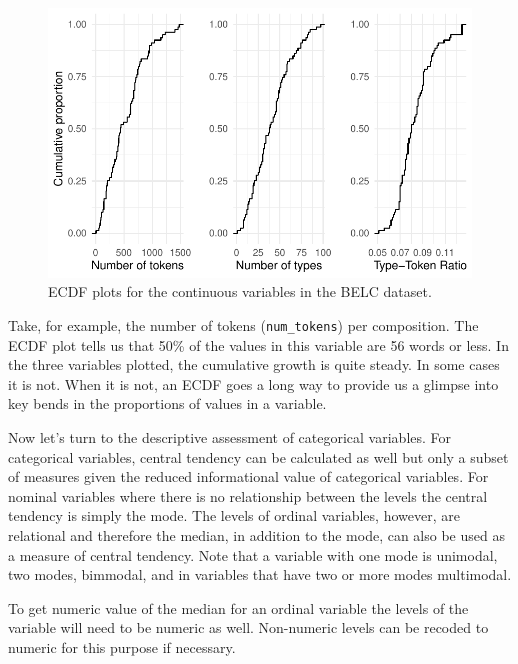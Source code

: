 \documentclass[
  letterpaper,
]{scrbook}
\begin{document}
\begin{figure}[h]

{\centering \includegraphics{./approaching-analysis_files/figure-pdf/fig-summarize-ecdf-belc-1.pdf}

}

\caption{\label{fig-summarize-ecdf-belc}ECDF plots for the continuous
variables in the BELC dataset.}

\end{figure}

Take, for example, the number of tokens (\texttt{num\_tokens}) per
composition. The ECDF plot tells us that 50\% of the values in this
variable are 56 words or less. In the three variables plotted, the
cumulative growth is quite steady. In some cases it is not. When it is
not, an ECDF goes a long way to provide us a glimpse into key bends in
the proportions of values in a variable.

Now let's turn to the descriptive assessment of categorical variables.
For categorical variables, central tendency can be calculated as well
but only a subset of measures given the reduced informational value of
categorical variables. For nominal variables where there is no
relationship between the levels the central tendency is simply the mode.
The levels of ordinal variables, however, are relational and therefore
the median, in addition to the mode, can also be used as a measure of
central tendency. Note that a variable with one mode is unimodal, two
modes, bimmodal, and in variables that have two or more modes
multimodal.

\begin{tcolorbox}[enhanced jigsaw, title=\textcolor{quarto-callout-warning-color}{\faExclamationTriangle}\hspace{0.5em}{Tip}, breakable, colback=white, colframe=quarto-callout-warning-color-frame, bottomrule=.15mm, left=2mm, bottomtitle=1mm, colbacktitle=quarto-callout-warning-color!10!white, opacityback=0, arc=.35mm, toprule=.15mm, coltitle=black, leftrule=.75mm, opacitybacktitle=0.6, toptitle=1mm, titlerule=0mm, rightrule=.15mm]

To get numeric value of the median for an ordinal variable the levels of
the variable will need to be numeric as well. Non-numeric levels can be
recoded to numeric for this purpose if necessary.

\end{tcolorbox}
\end{document}
